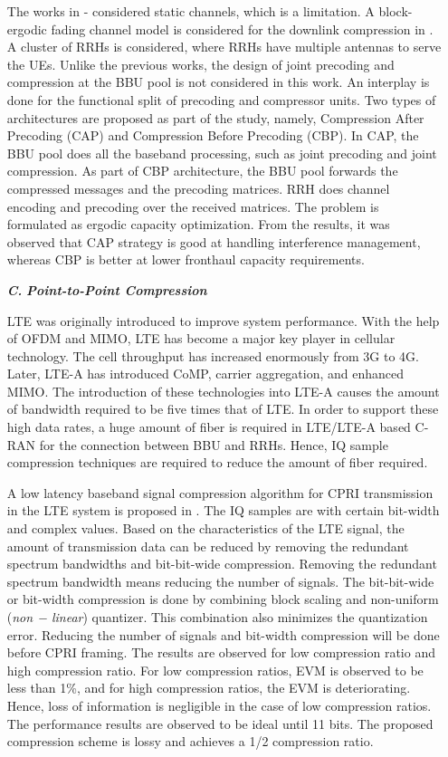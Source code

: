 \begin{multicols}{2}
\begin{itemize}
The works in \cite{art3-key59}-\cite{art3-key61} considered static channels, which is a limitation. A block-ergodic fading channel model is considered for the downlink compression in \cite{art3-key62}. A cluster of RRHs is considered, where RRHs have multiple antennas to serve the UEs. Unlike the previous works, the design of joint precoding and compression at the BBU pool is not considered in this work. An interplay is done for the functional split of precoding and compressor units. Two types of architectures are proposed as part of the study, namely, Compression After Precoding (CAP) and Compression Before Precoding (CBP). In CAP, the BBU pool does all the baseband processing, such as joint precoding and joint compression. As part of CBP architecture, the BBU pool forwards the compressed messages and the precoding matrices. RRH does channel encoding and precoding over the received matrices. The problem is formulated as ergodic capacity optimization. From the results, it was observed that CAP strategy is good at handling interference management, whereas CBP is better at lower fronthaul capacity requirements.

\item[{\textit{\textbf{ C.}}}] {\textit{\textbf{Point-to-Point Compression}}}

LTE was originally introduced to improve system performance. With the help of OFDM and MIMO, LTE has become a major key player in cellular technology. The cell throughput has increased enormously from 3G to 4G. Later, LTE-A has introduced CoMP, carrier aggregation, and enhanced MIMO. The introduction of these technologies into LTE-A causes the amount of bandwidth required to be five times that of LTE. In order to support these high data rates, a huge amount of fiber is required in LTE/LTE-A based C-RAN for the connection between BBU and RRHs. Hence, IQ sample compression techniques are required to reduce the amount of fiber required.

A low latency baseband signal compression algorithm for CPRI transmission in the LTE system is proposed in \cite{art3-key63}. The IQ samples are with certain bit-width and complex values. Based on the characteristics of the LTE signal, the amount of transmission data can be reduced by removing the redundant spectrum bandwidths and bit-bit-wide compression. Removing the redundant spectrum bandwidth means reducing the number of signals. The bit-bit-wide or bit-width compression is done by combining block scaling and non-uniform (\textit{non − linear}) quantizer. This combination also minimizes the quantization error. Reducing the number of signals and bit-width compression will be done before CPRI framing. The results are observed for low compression ratio and high compression ratio. For low compression ratios, EVM is observed to be less than 1\%, and for high compression ratios, the EVM is deteriorating. Hence, loss of information is negligible in the case of low compression ratios. The performance results are observed to be ideal until 11 bits. The proposed compression scheme is lossy and achieves a 1/2 compression ratio.


\end{itemize}
\end{multicols}
